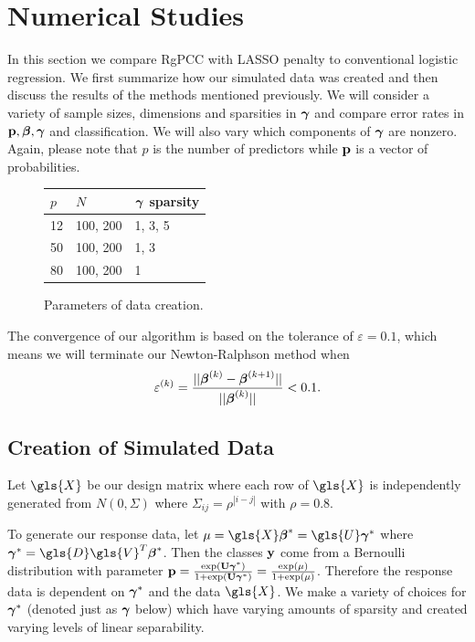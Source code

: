 \documentclass[main.tex]{subfiles}
\begin{document}
\section{Numerical Studies}
In this section we compare RgPCC with LASSO penalty to conventional logistic regression. We first summarize how our simulated data was created and then discuss the results of the methods mentioned previously. We will consider a variety of sample sizes, dimensions and sparsities in $\boldsymbol \gamma$ and compare error rates in $\mathbf{p}, \boldsymbol \beta, \boldsymbol \gamma$ and classification. We will also vary which components of $\boldsymbol \gamma$ are nonzero. Again, please note that $p$ is the number of predictors while $\mathbf{p}$ is a vector of probabilities.

\begin{figure}[H]
	\begin{tabular}{l l l} \hline
		$p$ & $N$ & $\boldsymbol \gamma$ sparsity \\ \hline
		\rowcolor{LightCyan}
		12 & 100, 200 & 1, 3, 5 \\
		50 & 100, 200 & 1, 3 \\
		\rowcolor{LightCyan}
		80 & 100, 200 & 1 \\ \hline
	\end{tabular}
	\caption{Parameters of data creation.}
	\label{figure:params}
\end{figure}

The convergence of our algorithm is based on the tolerance of $\varepsilon = 0.1$, which means we will terminate our Newton-Ralphson method when $$\varepsilon^{(k)} = \frac{||\boldsymbol \beta^{(k)} - \boldsymbol \beta^{(k+1)}||}{||\boldsymbol \beta^{(k)}||} < 0.1.$$

\subsection{Creation of Simulated Data}
Let $\gls{X}$ be our design matrix where each row of $\gls{X}$ is independently generated from $N(0, \Sigma)$ where $\Sigma_{ij} = \rho^{|i - j|}$ with $\rho = 0.8$.

To generate our response data, let $\mu = \gls{X} \bbeta^* = \gls{U} \bgamma^*$ where $\bgamma^* = \gls{D} \gls{V}^T \bbeta^*$. Then the classes $\mathbf{y}$ come from a Bernoulli distribution with parameter $\mathbf{p} = \frac{\text{exp}(\mathbf{U} \boldsymbol \gamma^*)}{1 + \text{exp}(\mathbf{U} \boldsymbol \gamma^*)} = \frac{\text{exp}(\mu)}{1 + \text{exp}(\mu)}$. Therefore the response data is dependent on $\boldsymbol \gamma^*$ and the data $\gls{X}$. We make a variety of choices for $\boldsymbol \gamma^*$ (denoted just as $\boldsymbol \gamma$ below) which have varying amounts of sparsity and created varying levels of linear separability.
\end{document}
